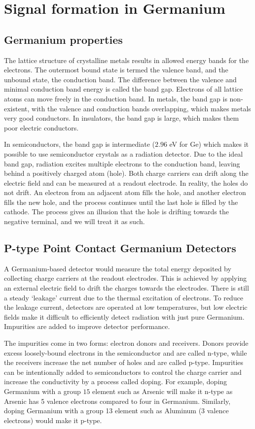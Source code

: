 \section{Signal formation in Germanium}
\subsection{Germanium properties}
The lattice structure of crystalline metals results in allowed energy bands for the electrons. The outermost bound state is termed the valence band, and the unbound state, the conduction band. The difference between the valence and minimal conduction band energy is called the band gap. Electrons of all lattice atoms can move freely in the conduction band. In metals, the band gap is non-existent, with the valence and conduction bands overlapping, which makes metals very good conductors. In insulators, the band gap is large, which makes them poor electric conductors.

In semiconductors, the band gap is intermediate ($2.96$ eV for Ge) which makes it possible to use semiconductor crystals as a radiation detector. Due to the ideal band gap, radiation excites multiple electrons to the conduction band, leaving behind a positively charged atom (hole). Both charge carriers can drift along the electric field and can be measured at a readout electrode. In reality, the holes do not drift. An electron from an adjacent atom fills the hole, and another electron fills the new hole, and the process continues until the last hole is filled by the cathode. The process gives an illusion that the hole is drifting towards the negative terminal, and we will treat it as such.

\subsection{P-type Point Contact Germanium Detectors}
A Germanium-based detector would measure the total energy deposited by collecting charge carriers at the readout electrodes. This is achieved by applying an external electric field to drift the charges towards the electrodes. There is still a steady `leakage' current due to the thermal excitation of electrons. To reduce the leakage current, detectors are operated at low temperatures, but low electric fields make it difficult to efficiently detect radiation with just pure Germanium. Impurities are added to improve detector performance.

The impurities come in two forms: electron donors and receivers. Donors provide excess loosely-bound electrons in the semiconductor and are called n-type, while the receivers increase the net number of holes and are called p-type. Impurities can be intentionally added to semiconductors to control the charge carrier and increase the conductivity by a process called doping. For example, doping Germanium with a group $15$ element such as Arsenic will make it n-type as Arsenic has 5 valence electrons compared to four in Germanium. Similarly, doping Germanium with a group 13 element such as Aluminum (3 valence electrons) would make it p-type.

